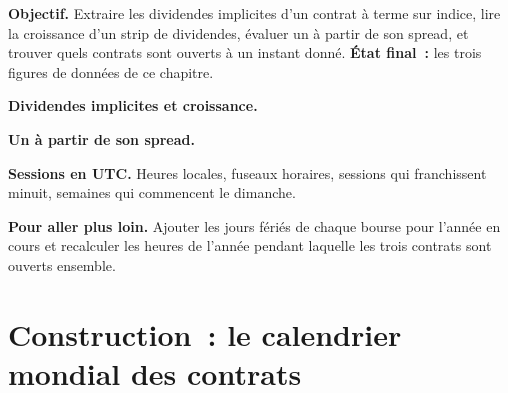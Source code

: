 \begin{tutorial}
\textbf{Objectif.} Extraire les dividendes implicites d'un contrat à terme sur indice, lire la
croissance d'un strip de dividendes, évaluer un  à partir de son
spread, et trouver quels contrats sont ouverts à un instant donné. \textbf{État final~:} les
trois figures de données de ce chapitre.
\begin{tutsteps}
\item \textbf{Dividendes implicites et croissance.}
\label{lst:m1:index-and-single-stock-futures-worldwide:implied}
\item \textbf{Un  à partir de son spread.}
\label{lst:m1:index-and-single-stock-futures-worldwide:trf}
\item \textbf{Sessions en UTC.} Heures locales, fuseaux horaires, sessions qui franchissent
minuit, semaines qui commencent le dimanche.
\label{lst:m1:index-and-single-stock-futures-worldwide:session}
\end{tutsteps}
\textbf{Pour aller plus loin.} Ajouter les jours fériés de chaque bourse pour l'année
en cours et recalculer les heures de l'année pendant laquelle les trois contrats sont
ouverts ensemble.
\end{tutorial}

\section{Construction~: le calendrier mondial des contrats}\label{bld:m1:index-and-single-stock-futures-worldwide:calendar}

